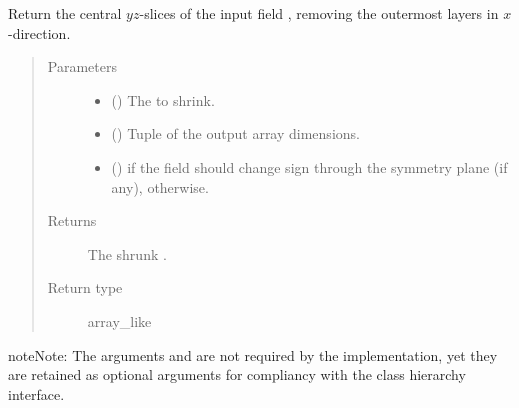 \documentclass[letterpaper,10pt,english]{sphinxmanual}
\begin{document}
\begin{fulllineitems}

\begin{fulllineitems}
\label{\detokenize{api:tasmania.dycore.horizontal_boundary_periodic.PeriodicYZ.from_computational_to_physical_domain}}
Return the central \(yz\)-slices of the input field , removing the  outermost
layers in \(x\)-direction.
\begin{quote}\begin{description}
\item[{Parameters}] \leavevmode\begin{itemize}
\item {} 
 () \textendash{} The  to shrink.

\item {} 
 () \textendash{} Tuple of the output array dimensions.

\item {} 
 () \textendash{}  if the field should change sign through the symmetry plane (if any),  otherwise.

\end{itemize}

\item[{Returns}] \leavevmode
The shrunk .

\item[{Return type}] \leavevmode
array\_like

\end{description}\end{quote}

\begin{sphinxadmonition}{note}{Note:}
The arguments  and  are not required by the implementation,
yet they are retained as optional arguments for compliancy with the class hierarchy interface.
\end{sphinxadmonition}


\end{fulllineitems}
\end{fulllineitems}
\end{document}
